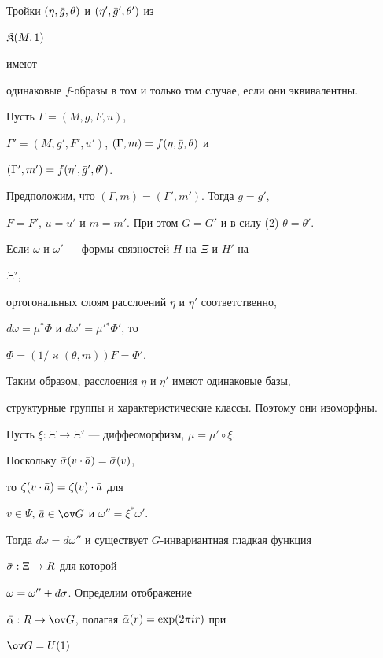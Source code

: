  


\begin{lem} Тройки $(\eta,\Bar g,\theta)$ и $(\eta',\Bar g',\theta')$ из 


$\frak K(M,1)$ 


имеют 


одинаковые $f$-образы в том и только том случае, если они эквивалентны. 


\end{lem} 


 


\begin{pf} Пусть $\Gamma=(M,g,F,u)$, 


$\Gamma'=(M,g',F',u')$, $(\Gamma,m)=f(\eta,\Bar g,\theta)$ и 


$(\Gamma',m')=f(\eta',\Bar g',\theta')$. 


Предположим, что $(\Gamma,m)=(\Gamma',m')$. Тогда $g=g'$, 


$F=F'$, $u=u'$ и $m=m'$. При этом $G=G'$ и в силу (2) $\theta=\theta'$. 


Если $\omega$ и $\omega'$ --- формы связностей $H$ на $\Xi$ и $H'$ на 


$\Xi'$, 


ортогональных слоям расслоений $\eta$ и $\eta'$ соответственно, 


$d\omega=\mu^*\Phi$ и $d\omega'=\mu'{}^*\Phi'$, то 


$\Phi=(1/\varkappa(\theta,m))F=\Phi'$. 


Таким образом, расслоения $\eta$ и $\eta'$ имеют одинаковые базы, 


структурные группы и характеристические классы. Поэтому они изоморфны. 


Пусть $\xi:\Xi\to\Xi'$ --- диффеоморфизм, $\mu=\mu'\circ\xi$. 


Поскольку $\Bar\sigma(v\cdot\Bar a)=\Bar\sigma(v)$, 


то $\zeta(v\cdot\Bar a)=\zeta(v)\cdot\Bar a$ для


$v\in\Psi$, $\Bar a\in\ov G$ и $\omega''=\xi^*\omega'$. 


Тогда $d\omega=d\omega''$ и существует $G$-инвариантная гладкая функция 


$\Bar\sigma:\Xi\to R$ для которой 


$\omega=\omega''+d\Bar\sigma$. Определим отображение 


$\Bar\alpha:R\to\ov G$, полагая $\Bar\alpha(r)=\exp(2\pi ir)$ при 


$\ov G=U(1)$ 



\end{pf}
